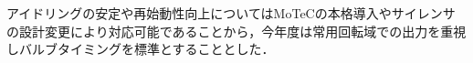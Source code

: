 アイドリングの安定や再始動性向上についてはMoTeCの本格導入やサイレンサの設計変更により対応可能であることから，今年度は常用回転域での出力を重視しバルブタイミングを標準とすることとした．










